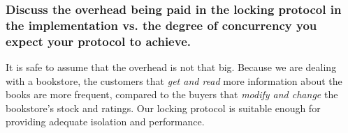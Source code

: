 \documentclass{article}      %
\begin{document}
\subsubsection*{Discuss the overhead being paid in the locking protocol in the implementation vs. the degree of concurrency you expect your protocol to achieve.}

It is safe to assume that the overhead is not that big. Because we are dealing with a bookstore, the customers that \emph{get and read}  more information about the books are more frequent, compared to the buyers that \emph{modify and change} the bookstore's stock and ratings. Our locking protocol is suitable enough for providing adequate isolation and performance.

\newpage
\end{document}
